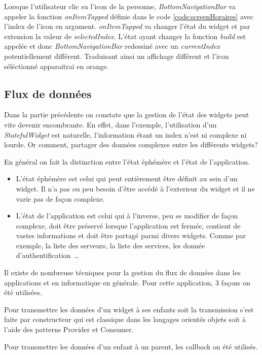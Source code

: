     Lorsque l'utilisateur clic su l'icon de la personne, \textit{BottomNavigationBar} va appeler la fonction \textit{onItemTapped} définie dans le code \ref{code:screenHoraires} avec
    l'index de l'icon en argument. \textit{onItemTapped} va changer l'état du widget et par extension la valeur de \textit{selectedIndex}. L'état ayant changer la fonction
    \textit{build} est appelée et donc \textit{BottomNavigationBar} redessiné avec un \textit{currentIndex} potentiellement différent. Traduisant ainsi 
    un affichage différent et l'icon séléctionné apparaitrai en orange. 

    \subsection{Flux de données}
    Dans la partie précédente on constate que la gestion de l'état des widgets peut vite devenir encombrante. En effet, dans l'exemple,
    l'utilisation d'un \textit{StatefulWidget} est naturelle, l'information étant un index n'est ni complexe ni lourde. Or comment, partager des 
    données complexes entre les différents widgets?

    En général on fait la distinction entre l'état éphémère et l'état de l'application.
    \smallskip
    \begin{itemize}
        \item L'état éphémère est celui qui peut entièrement être définit au sein d'un widget. Il n'a pas ou peu besoin d'être
        accédé à l'exterieur du widget et il ne varie pas de façon complexe.
        \item L'état de l'application est celui qui à l'inverse, peu se modifier de façon complexe, doit être préservé lorsque l'application est fermée, 
        contient de vastes informations et doit être partagé parmi divers widgets. Comme par exemple, la liste des serveurs, la liste des services, les 
        donnée d'authentification~\dots
    \end{itemize}

    Il existe de nombreuse técniques pour la gestion du flux de données dans les applications et en informatique en générale. Pour cette application, 3 façons
    on été utilisées. 
    
    Pour transmettre les données d'un widget à ses enfants soit la transmission s'est faite par constructeur qui est classique dans les langages orientés 
    objets soit à l'aide des patterns Provider et Consumer.

    Pour transmettre les données d'un enfant à un parent, les callback on été utilisés.
